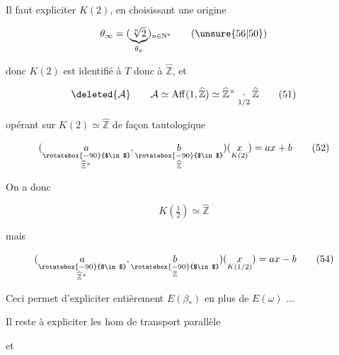 

Il faut expliciter $K(2)$,  en choisissant une origine

\[
\theta_\infty=(\underbrace{\sqrt[n]{2}}_{\theta_n})_{n\in\mathbb N^*}
\tag*{(\unsure{56|50})}
\]

donc $K(2)$ est identifié à $T$ donc à $\widehat{\mathbb Z}$, et

\[
\deleted{\mathcal A}\qquad\mathcal A\simeq\operatorname{Aff}(1,\widehat{\mathbb Z})\simeq\widehat{\mathbb Z}^{\times}\underset{1/2}{\cdot}\widehat{\mathbb Z}
\tag*{(51)}
\]

opérant sur $K(2)\simeq\widehat{\mathbb Z}$ de façon tautologique

\[
(\underset{\substack{\rotatebox{-90}{$\in$}\\\widehat{\mathbb Z}^{\times}}}{a},
\underset{\substack{\rotatebox{-90}{$\in$}\\\widehat{\mathbb Z}}}{b})(\underset{K(2)}{x})=ax+b
\tag*{(52)}
\]

On a donc

\[
K(\tfrac12)\simeq\widehat{\mathbb Z}
\tag*{(53)}
\]

mais 

\[
(\underset{\substack{\rotatebox{-90}{$\in$}\\\widehat{\mathbb Z}^{\times}}}{a},
\underset{\substack{\rotatebox{-90}{$\in$}\\\mathbb Z}}{b})(\underset{K(1/2)}{x})=ax-b
\tag*{(54)}
\]

Ceci permet d'expliciter entièrement $E(\beta_*)$ en plus de $E(\omega)$ ...

Il reste  à expliciter les hom de transport parallèle


et


